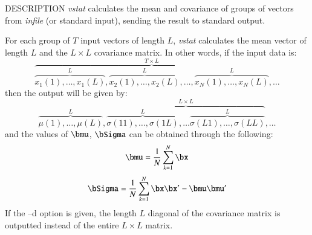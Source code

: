 \begin{synopsis}
\item[vstat] [ --l $L$ ] [ --n $N$ ] [ --t $T$ ] [ --c $C$ ] [ --d ] [ --o $O$ ] [ {\em infile} ]
\end{synopsis}

\begin{qsection}{DESCRIPTION}
{\em vstat} calculates the mean and covariance of groups of vectors 
from {\em infile} (or standard input), 
sending the result to standard output.

For each group of $T$ input vectors of length $L$, 
{\em vstat} calculates the mean vector of length $L$ 
and the $L\times L$ covariance matrix. 
In other words, if the input data is:
\begin{displaymath}
\overbrace{
  \overbrace{x_1(1),\dots,x_1(L)}^{L},
  \overbrace{x_2(1),\dots,x_2(L)}^{L},\dots,
  \overbrace{x_N(1),\dots,x_N(L)}^{L}
}^{T \times L},\dots
\end{displaymath}
then the output will be given by:
\begin{displaymath}
  \overbrace{\mu(1),\dots,\mu(L)}^L, 
  \overbrace{
    \overbrace{\sigma(11),\dots,\sigma(1L)}^L, \dots
    \overbrace{\sigma(L1),\dots,\sigma(LL)}^L
  }^{L\times L}, \dots
\end{displaymath}
and the values of $\bmu$, $\bSigma$ can be obtained through the following:
\begin{displaymath}
  \bmu = \frac{1}{N}\sum_{k=1}^{N} \bx
\end{displaymath}
\begin{displaymath}
  \bSigma = \frac{1}{N}\sum_{k=1}^{N}
	\bx \bx'
	- \bmu \bmu'
\end{displaymath}
If the --d option is given, 
the length $L$ diagonal of the covariance matrix is outputted 
instead of the entire $L\times L$ matrix.


\end{qsection}
